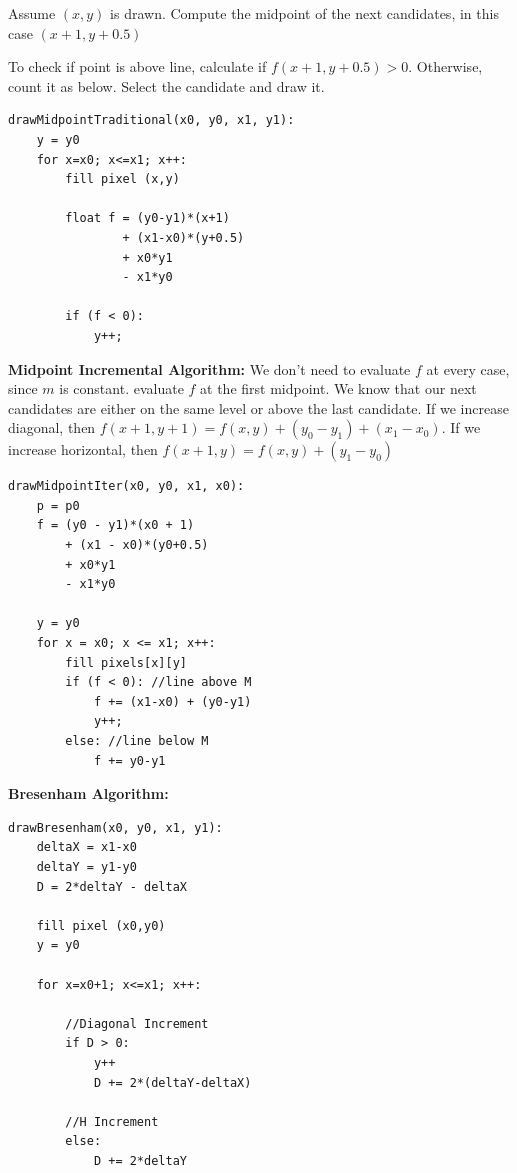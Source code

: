 \documentclass[letterpaper, 8pt]{extarticle}
\begin{document}
\begin{multicols*}{4}
Assume $(x, y)$ is drawn. Compute the midpoint of the next candidates, in this case $(x+1, y+0.5)$

To check if point is above line, calculate if $f(x+1, y+0.5) > 0$. Otherwise, count it as below. Select the candidate and draw it.

\begin{lstlisting} 
drawMidpointTraditional(x0, y0, x1, y1):
    y = y0
    for x=x0; x<=x1; x++:
        fill pixel (x,y)

        float f = (y0-y1)*(x+1) 
                + (x1-x0)*(y+0.5) 
                + x0*y1 
                - x1*y0

        if (f < 0): 
            y++;
\end{lstlisting}


\textbf{Midpoint Incremental Algorithm:} We don't need to evaluate $f$ at every case, since $m$ is constant.
evaluate $f$ at the first midpoint. We know that our next candidates are either on the same level or above the last candidate.
If we increase diagonal, then $f(x+1, y+1) = f(x,y) + (y_0 - y_1) + (x_1 - x_0)$. If we increase horizontal, then $f(x+1, y) = f(x, y) + (y_1 - y_0)$

\begin{lstlisting}
drawMidpointIter(x0, y0, x1, x0):
    p = p0
    f = (y0 - y1)*(x0 + 1) 
        + (x1 - x0)*(y0+0.5) 
        + x0*y1
        - x1*y0

    y = y0
    for x = x0; x <= x1; x++:
        fill pixels[x][y]
        if (f < 0): //line above M
            f += (x1-x0) + (y0-y1) 
            y++;
        else: //line below M
            f += y0-y1
\end{lstlisting}

\textbf{Bresenham Algorithm:}

\begin{lstlisting} 
drawBresenham(x0, y0, x1, y1):
    deltaX = x1-x0
    deltaY = y1-y0
    D = 2*deltaY - deltaX

    fill pixel (x0,y0)
    y = y0

    for x=x0+1; x<=x1; x++:

        //Diagonal Increment
        if D > 0:
            y++
            D += 2*(deltaY-deltaX)

        //H Increment
        else:
            D += 2*deltaY
        

\end{lstlisting}
\end{multicols*}
\end{document}
